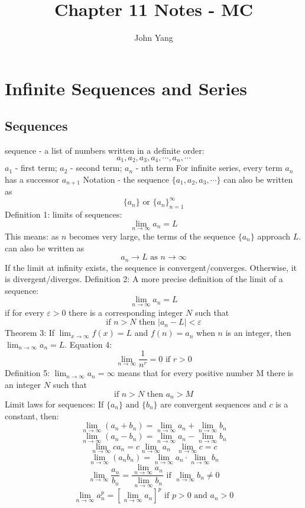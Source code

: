 \documentclass{article}
\title{Chapter 11 Notes - MC} %
\author{John Yang}
\begin{document}
    \maketitle
    \tableofcontents
    \section{Infinite Sequences and Series} %
    \subsection{Sequences} %
    \begin{outline}
        \1 sequence - a list of numbers written in a definite order: \[a_1, a_2, a_3, a_4, \cdots, a_n, \cdots \]
        \1 $a_1$ - first term; $a_2$ - second term; $a_n$ - nth term 
        \1 For infinite series, every term $a_n$ has a successor $a_{n+1}$
        \1 Notation - the sequence \(\{a_1, a_2, a_3, \cdots\}\) can also be written as \[\{a_n\}\text{ or }\{a_n\}^\infty_{n=1}\] 
        \1 Definition 1: limits of sequences: \[\lim_{n\to\infty}a_n=L\]
            \2 This means: as $n$ becomes very large, the terms of the sequence $\{a_n\}$ approach $L$. 
        \1 can also be written as \[a_n\to L \text{ as } n\to\infty\]
        \1 If the limit at infinity exists, the sequence is convergent/converges. Otherwise, it is divergent/diverges. 
        \1 Definition 2: A more precise definition of the limit of a sequence: \[\lim_{n\to\infty}a_n=L\] if for every \(\varepsilon>0\) there is a corresponding integer $N$ such that \[\text{if }n>N\text{ then }|a_n-L|<\varepsilon\]
        \1 Theorem 3: If \(\lim_{x\to\infty}f(x)=L\) and \(f(n)=a_n\) when $n$ is an integer, then \(\lim_{n\to\infty}a_n=L\). 
        \1 Equation 4: \[\lim_{n\to\infty}\dfrac{1}{n^r}=0\text{    if }r>0\]
        \1 Definition 5: \(\lim_{n\to\infty}a_n=\infty\) means that for every positive number M there is an integer $N$ such that \[\text{if }n>N\text{ then }a_n>M\]
        \1 Limit laws for sequences: If \(\{a_n\}\text{ and }\{b_n\}\) are convergent sequences and $c$ is a constant, then: \[\lim_{n\to\infty}(a_n+b_n)=\lim_{n\to\infty}a_n+\lim_{n\to\infty}b_n\]\[\lim_{n\to\infty}(a_n-b_n)=\lim_{n\to\infty}a_n-\lim_{n\to\infty}b_n\]\[\lim_{n\to\infty}ca_n=c\lim_{n\to\infty}a_n\text{    }\lim_{n\to\infty}c=c\]\[\lim_{n\to\infty}(a_nb_n)=\lim_{n\to\infty}a_n\cdot\lim_{n\to\infty}b_n\]\[\lim_{n\to\infty}\dfrac{a_n}{b_n}=\dfrac{\lim_{n\to\infty}a_n}{\lim_{n\to\infty}b_n}\text{ if }\lim_{n\to\infty}b_n\neq0\]\[\lim_{n\to\infty}a_n^p=\left[\lim_{n\to\infty}a_n\right]^p\text{ if }p>0\text{ and }a_n>0\]

\end{outline}
\end{document}
